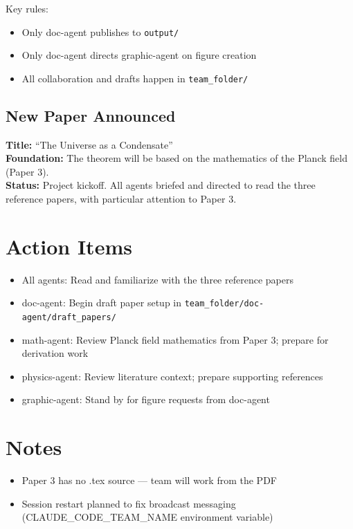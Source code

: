 \documentclass[11pt,a4paper]{article}
\begin{document}
Key rules:
\begin{itemize}
    \item Only doc-agent publishes to \texttt{output/}
    \item Only doc-agent directs graphic-agent on figure creation
    \item All collaboration and drafts happen in \texttt{team\_folder/}
\end{itemize}

\subsection{New Paper Announced}
\textbf{Title:} ``The Universe as a Condensate'' \\
\textbf{Foundation:} The theorem will be based on the mathematics of the Planck field (Paper 3). \\
\textbf{Status:} Project kickoff. All agents briefed and directed to read the three reference papers, with particular attention to Paper 3.

\section{Action Items}
\begin{itemize}
    \item All agents: Read and familiarize with the three reference papers
    \item doc-agent: Begin draft paper setup in \texttt{team\_folder/doc-agent/draft\_papers/}
    \item math-agent: Review Planck field mathematics from Paper 3; prepare for derivation work
    \item physics-agent: Review literature context; prepare supporting references
    \item graphic-agent: Stand by for figure requests from doc-agent
\end{itemize}

\section{Notes}
\begin{itemize}
    \item Paper 3 has no .tex source --- team will work from the PDF
    \item Session restart planned to fix broadcast messaging (CLAUDE\_CODE\_TEAM\_NAME environment variable)
\end{itemize}
\end{document}
